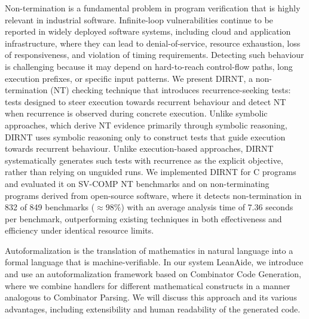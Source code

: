 \documentclass[a4paper,UKenglish]{dagrep-v2021}
\begin{document}

Non-termination is a fundamental problem in program verification that is highly relevant in industrial software. Infinite-loop vulnerabilities continue to be reported in widely deployed software systems, including cloud and application infrastructure, where they can lead to denial-of-service, resource exhaustion, loss of responsiveness, and violation of timing requirements. Detecting such behaviour is challenging because it may depend on hard-to-reach control-flow paths, long execution prefixes, or specific input patterns. We present DIRNT, a non-termination (NT) checking technique that introduces recurrence-seeking tests: tests designed to steer execution towards recurrent behaviour and detect NT when recurrence is observed during concrete execution. Unlike symbolic approaches, which derive NT evidence primarily through symbolic reasoning, DIRNT uses symbolic reasoning only to construct tests that guide execution towards recurrent behaviour. Unlike execution-based approaches, DIRNT systematically generates such tests with recurrence as the explicit objective, rather than relying on unguided runs. We implemented DIRNT for C programs and evaluated it on SV-COMP NT benchmarks and on non-terminating programs derived from open-source software, where it detects non-termination in 832 of 849 benchmarks ($\approx 98\%$) with an average analysis time of 7.36 seconds per benchmark, outperforming existing techniques in both effectiveness and efficiency under identical resource limits.


Autoformalization is the translation of mathematics in natural language into a formal language that is machine-verifiable. In our system LeanAide, we introduce and use an autoformalization framework based on Combinator Code Generation, where we combine handlers for different mathematical constructs in a manner analogous to Combinator Parsing. We will discuss this approach and its various advantages, including extensibility and human readability of the generated code.

\end{document}
